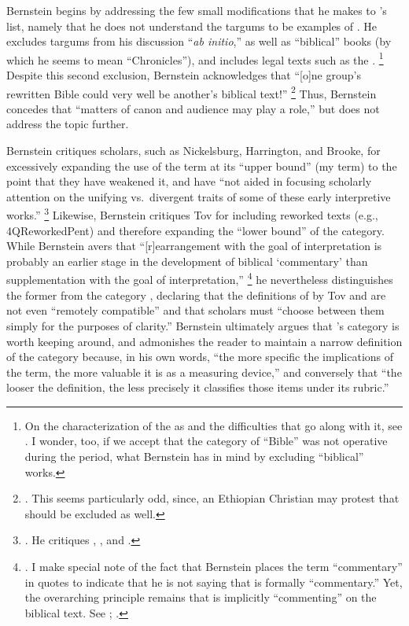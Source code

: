 Bernstein begins by addressing the few small modifications that he makes to \vermes's list, namely that he does not understand the targums to be examples of \rwb. He excludes targums from his discussion ``\emph{ab initio},'' as well as ``biblical'' books (by which he seems to mean ``Chronicles''), and includes legal texts such as the \templescroll.%
    \footnote{%
        On the characterization of the \templescroll as \rwb and the difficulties that go along with it, see 
        \cite{fraade_goldstein-etal2017}. 
        I wonder, too, if we accept that the category of ``Bible'' was not operative during the \secondtemple period, what Bernstein has in mind by excluding ``biblical'' works.}
Despite this second exclusion, Bernstein acknowledges that ``[o]ne group's rewritten Bible could very well be another's biblical text!''%
    \footnote{%
        \Cite[175]{bernstein_textus2005}.
        This seems particularly odd, since, an Ethiopian Christian may protest that \jub should be excluded as well.}
Thus, Bernstein concedes that ``matters of canon and audience may play a role,'' but does not address the topic further. 

Bernstein critiques scholars, such as Nickelsburg, Harrington, and Brooke, for excessively expanding the use of the term \rwb at its ``upper bound'' (my term) to the point that they have weakened it, and have ``not aided in focusing scholarly attention on the unifying vs.~divergent traits of some of these early interpretive works.''%
    \footnote{%
        \Cite[179]{bernstein_textus2005}. He critiques 
        \cite{nickelsburg_stone1984}, 
        \cite{harrington_kraft-nickelsburg1986}, and 
        \cite{brooke_schiffman-vanderkam2000}.}
Likewise, Bernstein critiques Tov for including reworked texts (e.g., 4QReworkedPent) and therefore expanding the ``lower bound'' of the category. While Bernstein avers that ``[r]earrangement with the goal of interpretation is probably an earlier stage in the development of biblical `commentary' than supplementation with the goal of interpretation,''%
    \footnote{%
        \Cite[183]{bernstein_textus2005}. I make special note of the fact that Bernstein places the term ``commentary'' in quotes to indicate that he is not saying that \rwb is formally ``commentary.'' Yet, the overarching principle remains that \rwb is implicitly ``commenting'' on the biblical text. See 
        \cite{fraade_bakhos2006}; 
        \cite{fraade_zsengeller2014}.}
he nevertheless distinguishes the former from the category \rwb, declaring that the definitions of \rwb by Tov and \vermes are not even ``remotely compatible'' and that scholars must ``choose between them simply for the purposes of clarity.''%
    \autocite[185]{bernstein_textus2005}
Bernstein ultimately argues that \vermes's category is worth keeping around, and admonishes the reader to maintain a narrow definition of the category because, in his own words, ``the more specific the implications of the term, the more valuable it is as a measuring device,''%
    \autocite[195]{bernstein_textus2005}
and conversely that ``the looser the definition, the less precisely it classifies those items under its rubric.''%
    \autocite[195]{bernstein_textus2005} 

